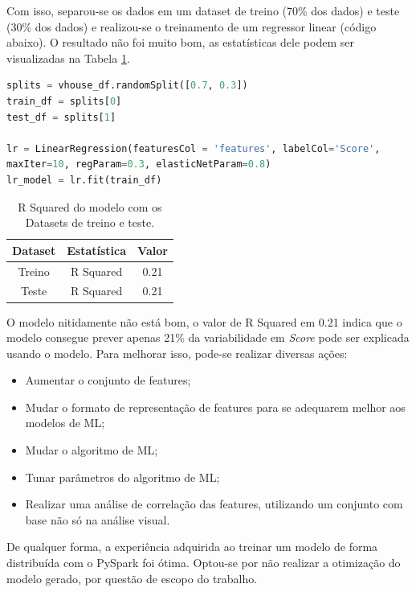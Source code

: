 \documentclass{article}
\begin{document}
Com isso, separou-se os dados em um dataset de treino (70\% dos dados) e teste (30\% dos dados) e realizou-se o treinamento de um regressor linear (código abaixo). O resultado não foi muito bom, as estatísticas dele podem ser visualizadas na Tabela \ref{tab:model_traign}.


\begin{lstlisting}[caption= {Treinamento de modelo de Regressão Linear.},captionpos=b, language=python]
splits = vhouse_df.randomSplit([0.7, 0.3])
train_df = splits[0]
test_df = splits[1]

lr = LinearRegression(featuresCol = 'features', labelCol='Score',
maxIter=10, regParam=0.3, elasticNetParam=0.8)
lr_model = lr.fit(train_df)
\end{lstlisting}

\begin{table}[H]
\centering
\begin{tabular}{|c|c|c|}
\hline
Dataset & Estatística & Valor \\ \hline \hline
Treino & R Squared & 0.21\\ \hline
Teste & R Squared & 0.21 \\ \hline
\end{tabular}
\caption{R Squared do modelo com os Datasets de treino e teste.}
\label{tab:model_traign}
\end{table}

O modelo nitidamente não está bom, o valor de R Squared em 0.21 indica que o modelo consegue prever apenas 21\% da variabilidade em \emph{Score} pode ser explicada usando o modelo. Para melhorar isso, pode-se realizar diversas ações:

\begin{itemize}
    \item Aumentar o conjunto de features;
    \item Mudar o formato de representação de features para se adequarem melhor aos modelos de ML;
    \item Mudar o algoritmo de ML;
    \item Tunar parâmetros do algoritmo de ML;
    \item Realizar uma análise de correlação das features, utilizando um conjunto com base não só na análise visual.
\end{itemize}

De qualquer forma, a experiência adquirida ao treinar um modelo de forma distribuída com o PySpark foi ótima. Optou-se por não realizar a otimização do modelo gerado, por questão de escopo do trabalho.
\end{document}
